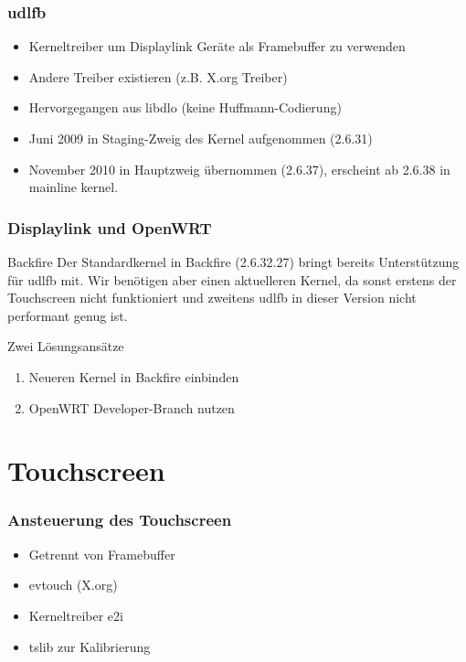\documentclass{beamer}
\begin{document}
	\begin{frame}
		\frametitle{udlfb}
		\begin{itemize}
			\item Kerneltreiber um Displaylink Geräte als Framebuffer zu verwenden
			\item Andere Treiber existieren (z.B. X.org Treiber)
			\item Hervorgegangen aus libdlo (keine Huffmann-Codierung)
			\item Juni 2009 in Staging-Zweig des Kernel aufgenommen (2.6.31)
			\item November 2010 in Hauptzweig übernommen (2.6.37), erscheint ab 2.6.38 in
        mainline kernel.
		\end{itemize}
	\end{frame}	
			
	\begin{frame}
		\frametitle{Displaylink und OpenWRT}
    \begin{block}{Backfire}
        Der Standardkernel in Backfire (2.6.32.27) bringt bereits Unterstützung für udlfb
        mit. Wir benötigen aber einen aktuelleren Kernel, da sonst erstens der Touchscreen
        nicht funktioniert und zweitens udlfb in dieser Version nicht performant genug
        ist.
    \end{block}
    \begin{block}{Zwei Lösungsansätze}
				\begin{enumerate}
					\item Neueren Kernel in Backfire einbinden
					\item OpenWRT Developer-Branch nutzen
				\end{enumerate}
    \end{block}
	\end{frame}

  \section{Touchscreen}
	
	\begin{frame}
		\frametitle{Ansteuerung des Touchscreen}
		\begin{itemize}
			\item Getrennt von Framebuffer
			\item evtouch (X.org)
			\item Kerneltreiber e2i
			\item tslib zur Kalibrierung
		\end{itemize}
	\end{frame}	
	
\end{document}
